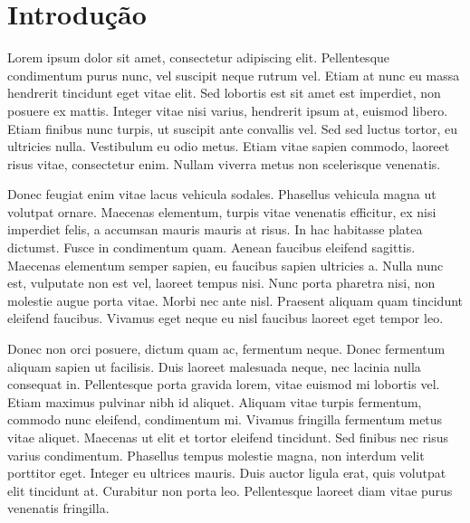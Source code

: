 \section{Introdução}

Lorem ipsum dolor sit amet, consectetur adipiscing elit. Pellentesque condimentum purus nunc, vel suscipit neque rutrum vel. Etiam at nunc eu massa hendrerit tincidunt eget vitae elit. Sed lobortis est sit amet est imperdiet, non posuere ex mattis. Integer vitae nisi varius, hendrerit ipsum at, euismod libero. Etiam finibus nunc turpis, ut suscipit ante convallis vel. Sed sed luctus tortor, eu ultricies nulla. Vestibulum eu odio metus. Etiam vitae sapien commodo, laoreet risus vitae, consectetur enim. Nullam viverra metus non scelerisque venenatis.

Donec feugiat enim vitae lacus vehicula sodales. Phasellus vehicula magna ut volutpat ornare. Maecenas elementum, turpis vitae venenatis efficitur, ex nisi imperdiet felis, a accumsan mauris mauris at risus. In hac habitasse platea dictumst. Fusce in condimentum quam. Aenean faucibus eleifend sagittis. Maecenas elementum semper sapien, eu faucibus sapien ultricies a. Nulla nunc est, vulputate non est vel, laoreet tempus nisi. Nunc porta pharetra nisi, non molestie augue porta vitae. Morbi nec ante nisl. Praesent aliquam quam tincidunt eleifend faucibus. Vivamus eget neque eu nisl faucibus laoreet eget tempor leo.

Donec non orci posuere, dictum quam ac, fermentum neque. Donec fermentum aliquam sapien ut facilisis. Duis laoreet malesuada neque, nec lacinia nulla consequat in. Pellentesque porta gravida lorem, vitae euismod mi lobortis vel. Etiam maximus pulvinar nibh id aliquet. Aliquam vitae turpis fermentum, commodo nunc eleifend, condimentum mi. Vivamus fringilla fermentum metus vitae aliquet. Maecenas ut elit et tortor eleifend tincidunt. Sed finibus nec risus varius condimentum. Phasellus tempus molestie magna, non interdum velit porttitor eget. Integer eu ultrices mauris. Duis auctor ligula erat, quis volutpat elit tincidunt at. Curabitur non porta leo. Pellentesque laoreet diam vitae purus venenatis fringilla.
